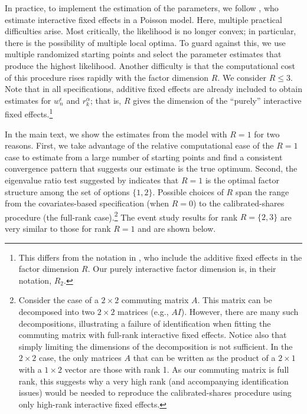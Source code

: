 \documentclass[11pt]{article}
\theoremstyle{definition}
\begin{document}
In practice, to implement the estimation of the parameters, we follow , who estimate interactive fixed effects in a Poisson model.
Here, multiple practical difficulties  arise.
Most critically, the likelihood is no longer convex; in particular, there is the possibility of multiple local optima.
To guard against this, we use multiple randomized starting points and select the parameter estimates that produce the highest likelihood.
Another difficulty is that the computational cost of this procedure rises rapidly with the factor dimension \(R\).
We consider \(R \leq 3\).
Note that in all specifications, additive fixed effects are already included to obtain estimates for ${w}_{n}^\epsilon$ and ${r}_{k}^\alpha$; that is, \(R\) gives the dimension of the ``purely'' interactive fixed effects.\footnote{This differs from the notation in \cite{chen2021nonlinear}, who include the additive fixed effects in the factor dimension  \(R\).
Our purely interactive factor dimension is, in their notation, \(R_2\).}

In the main text, we show the estimates from the model with \(R = 1\) for two reasons.
First, we take advantage of the relative computational ease of the \(R = 1\) case to estimate from a large number of starting points and find a consistent convergence pattern that suggests our estimate is the true optimum.
Second, the eigenvalue ratio test suggested by  indicates that \(R = 1\) is the optimal factor structure among the set of options \(\{1, 2\}\).
Possible choices of \(R\) span the range from the covariates-based specification (when \(R = 0\)) to the calibrated-shares procedure (the full-rank case).\footnote{
Consider the case of a \(2 \times 2\) commuting matrix \(A\).
This matrix can be decomposed into two \(2 \times 2\) matrices (e.g., $A I$).
However, there are many such decompositions, illustrating a failure of identification when fitting the commuting matrix with full-rank interactive fixed effects.
Notice also that simply limiting the dimensions of the decomposition is not sufficient.
In the \(2 \times 2\) case, the only matrices \(A\) that can be written as the product of a \(2 \times 1\) with a \(1 \times 2\) vector are those with rank 1.
As our commuting matrix is full rank, this suggests why a very high rank (and accompanying identification issues) would be needed to reproduce the calibrated-shares procedure using only high-rank interactive fixed effects.}
The event study results for rank $R=\{2,3\}$ are very similar to those for rank $R=1$ and are shown below.
\end{document}
